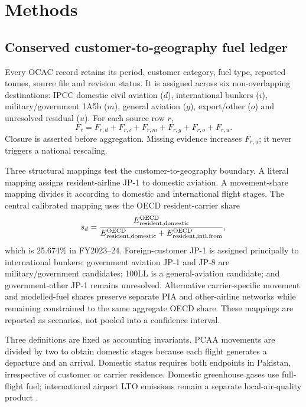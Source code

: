 \section{Methods}
\label{sec:methods}

\subsection{Conserved customer-to-geography fuel ledger}

Every OCAC record retains its period, customer category, fuel type, reported tonnes, source
file and revision status. It is assigned across six non-overlapping destinations: IPCC
domestic civil aviation ($d$), international bunkers ($i$), military/government 1A5b ($m$),
general aviation ($g$), export/other ($o$) and unresolved residual ($u$). For each source row
$r$,
\begin{equation}
F_r=F_{r,d}+F_{r,i}+F_{r,m}+F_{r,g}+F_{r,o}+F_{r,u}.
\label{eq:rowclosure}
\end{equation}
Closure is asserted before aggregation. Missing evidence increases $F_{r,u}$; it never triggers
a national rescaling.

Three structural mappings test the customer-to-geography boundary. A literal mapping assigns
resident-airline JP-1 to domestic aviation. A movement-share mapping divides it according to
domestic and international flight stages. The central calibrated mapping uses the OECD
resident-carrier share
\begin{equation}
s_d=\frac{E^{\rm OECD}_{\rm resident,domestic}}
{E^{\rm OECD}_{\rm resident,domestic}+E^{\rm OECD}_{\rm resident,intl.from}},
\label{eq:share}
\end{equation}
which is 25.674\% in FY2023--24. Foreign-customer JP-1 is assigned principally to international
bunkers; government aviation JP-1 and JP-8 are military/government candidates; 100LL is a
general-aviation candidate; and government-other JP-1 remains unresolved. Alternative
carrier-specific movement and modelled-fuel shares preserve separate PIA and other-airline
networks while remaining constrained to the same aggregate OECD share. These mappings are
reported as scenarios, not pooled into a confidence interval.

Three definitions are fixed as accounting invariants. PCAA movements are divided by two to
obtain domestic stages because each flight generates a departure and an arrival. Domestic
status requires both endpoints in Pakistan, irrespective of customer or carrier residence.
Domestic greenhouse gases use full-flight fuel; international airport LTO emissions remain a
separate local-air-quality product \citep{ipcc2006energy}.

